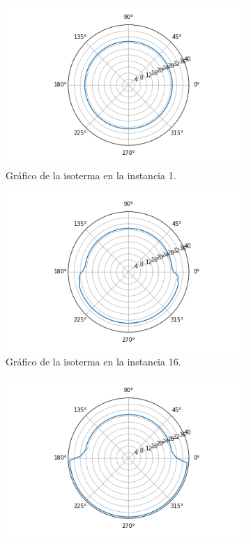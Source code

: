 \begin{figure}[H]
    \centering
    \begin{subfigure}{0.24\linewidth}
        \centering
        \includegraphics[scale=0.24]{img/EXP3/D3_40_80_0_isoterma}
        \caption{Gráfico de la isoterma en la instancia 1.}
        \label{fig:D3_40_80_0_isoterma}
    \end{subfigure}
    \hfill
    \begin{subfigure}{0.24\linewidth}
        \centering
        \includegraphics[scale=0.24]{img/EXP3/D3_40_80_15_isoterma}
        \caption{Gráfico de la isoterma en la instancia 16.}
        \label{fig:D3_40_80_15_isoterma}
    \end{subfigure}
    \hfill
    \begin{subfigure}{0.24\linewidth}
        \centering
        \includegraphics[scale=0.24]{img/EXP3/D3_40_80_31_isoterma}

\end{subfigure}
\end{figure}
